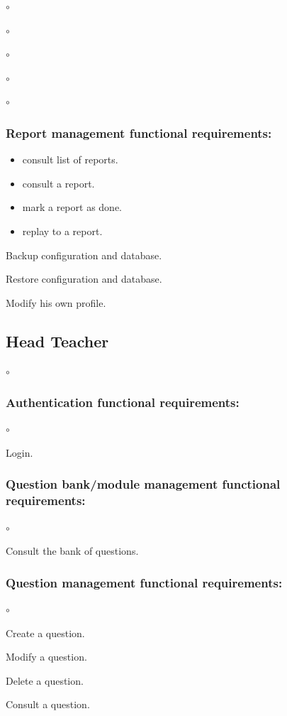 \documentclass[]{uc2pfecaneva}
\begin{document}
\begin{list}{$\circ$}{}
\begin{list}{$\circ$}{}
\begin{list}{$\circ$}{}
\begin{list}{$\circ$}{}
\begin{list}{$\circ$}{}
        \subsubsection{Report management functional requirements:}
        \begin{itemize}
            \item consult list of reports.
            \item consult a report.
            \item mark a report as done.
            \item replay to a report.
        \end{itemize}

        \item Backup configuration and database.
        \item Restore configuration and database.
        \item Modify his own profile.
    \end{list}


    \subsection{Head Teacher}
    \begin{list}{$\circ$}{}
        \subsubsection{Authentication functional requirements:}
        \begin{list}{$\circ$}{}
            \item Login.
        \end{list}


        \subsubsection{Question bank/module management functional requirements:}
        \begin{list}{$\circ$}{}
            \item Consult the bank of questions.
        \end{list}

        \subsubsection{Question management functional requirements:}
        \begin{list}{$\circ$}{}
            \item Create a question.
            \item Modify a question.
            \item Delete a question.
            \item Consult a question.
        \end{list}


\end{list}
\end{list}
\end{list}
\end{list}
\end{list}
\end{document}
